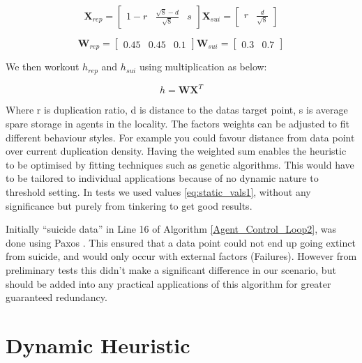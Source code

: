 \documentclass{UoYCSproject}
\begin{document}
\begin{equation}
\label{eq:static_vals2}
\textbf{X}_{rep} = \begin{bmatrix}1-r & \frac{\sqrt{8}-d}{\sqrt{8}} & s \end{bmatrix}
\textbf{X}_{sui} = \begin{bmatrix} r & \frac{d}{\sqrt{8}}\end{bmatrix}
\end{equation}

\begin{equation}
\label{eq:static_vals1}
\textbf{W}_{rep} = \begin{bmatrix}0.45 & 0.45 & 0.1\end{bmatrix}
\textbf{W}_{sui} = \begin{bmatrix}0.3 & 0.7 \end{bmatrix}
\end{equation}

We then workout $h_{rep}$ and $h_{sui}$ using multiplication as below:

\begin{equation}
\label{eq:10}
h = \textbf{W} \textbf{X} ^{T}
\end{equation}

Where r is duplication ratio, d is distance to the datas target point, s is average spare storage in agents in the locality.
The factors weights can be adjusted to fit different behaviour styles.
For example you could favour distance from data point over current duplication density.
Having the weighted sum enables the heuristic to be optimised by fitting techniques such as  genetic algorithms.
This would have to be tailored to individual applications because of no dynamic nature to threshold setting.
In tests we used values \ref{eq:static_vals1}, without any significance but purely from tinkering to get good results.

Initially “suicide data” in Line 16 of Algorithm \ref{Agent_Control_Loop2}, was done using Paxos \cite{Paxos}.
This ensured that a data point could not end up going extinct from suicide, and would only occur with external factors (Failures).
However from preliminary tests this didn’t make a significant difference in our scenario, but should be added into any practical applications of this algorithm for greater guaranteed redundancy.


\section{Dynamic Heuristic}
\label{sec:Simple3}
\end{document}
